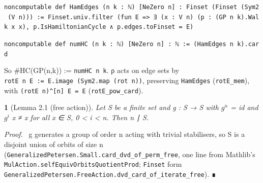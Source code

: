 \documentclass[11pt,a4paper]{article}
\theoremstyle{named}
\newtheorem*{namedthm}{}
\newenvironment{mdproof}[1][Proof]{\par\medskip\noindent\textit{#1.}\ }{\par\medskip}
\begin{document}
\begin{leancode}
\item \texttt{noncomputable\ \allowbreak{}def\ \allowbreak{}HamEdges\ \allowbreak{}(n\ \allowbreak{}k\ \allowbreak{}:\ \allowbreak{}ℕ)\ \allowbreak{}[NeZero\ \allowbreak{}n]\ \allowbreak{}:\ \allowbreak{}Finset\ \allowbreak{}(Finset\ \allowbreak{}(Sym2\ \allowbreak{}(V\ \allowbreak{}n)))\ \allowbreak{}:=\ \allowbreak{}Finset.\allowbreak{}univ.\allowbreak{}filter\ \allowbreak{}(fun\ \allowbreak{}E\ \allowbreak{}=\textgreater{}\ \allowbreak{}∃\ \allowbreak{}(x\ \allowbreak{}:\ \allowbreak{}V\ \allowbreak{}n)\ \allowbreak{}(p\ \allowbreak{}:\ \allowbreak{}(GP\ \allowbreak{}n\ \allowbreak{}k).\allowbreak{}Walk\ \allowbreak{}x\ \allowbreak{}x),\ \allowbreak{}p.\allowbreak{}IsHamiltonianCycle\ \allowbreak{}∧\ \allowbreak{}p.\allowbreak{}edges.\allowbreak{}toFinset\ \allowbreak{}=\ \allowbreak{}E)}
\item \texttt{noncomputable\ \allowbreak{}def\ \allowbreak{}numHC\ \allowbreak{}(n\ \allowbreak{}k\ \allowbreak{}:\ \allowbreak{}ℕ)\ \allowbreak{}[NeZero\ \allowbreak{}n]\ \allowbreak{}:\ \allowbreak{}ℕ\ \allowbreak{}:=\ \allowbreak{}(HamEdges\ \allowbreak{}n\ \allowbreak{}k).\allowbreak{}card}
\end{leancode}
So \#HC(GP(n,k)) := \texttt{numHC\ \allowbreak{}n\ \allowbreak{}k}. ρ acts on edge sets by \texttt{rotE\ \allowbreak{}n\ \allowbreak{}E\ \allowbreak{}:=\ \allowbreak{}E.\allowbreak{}image\ \allowbreak{}(Sym2.\allowbreak{}map\ \allowbreak{}(rot\ \allowbreak{}n))}, preserving \texttt{HamEdges} (\texttt{rotE\_\allowbreak{}mem}), with \texttt{(rotE\ \allowbreak{}n)\textasciicircum{}[n]\ \allowbreak{}E\ \allowbreak{}=\ \allowbreak{}E} (\texttt{rotE\_\allowbreak{}pow\_\allowbreak{}card}).

\begin{namedthm}[Lemma 2.1 (free action)]
Let S be a finite set and g : S → S with $g^n$ = id and $g^i$ x ≠ x for all x ∈ S, 0 \textless{} i \textless{} n. Then n ∣ \textbar{}S\textbar{}.
\end{namedthm}
\begin{mdproof}[Proof]
g generates a group of order n acting with trivial stabilisers, so S is a disjoint union of orbits of size n (\texttt{GeneralizedPetersen.\allowbreak{}Small.\allowbreak{}card\_\allowbreak{}dvd\_\allowbreak{}of\_\allowbreak{}perm\_\allowbreak{}free}, one line from Mathlib's \texttt{MulAction.\allowbreak{}selfEquivOrbitsQuotientProd}; \texttt{Finset} form \texttt{GeneralizedPetersen.\allowbreak{}FreeAction.\allowbreak{}dvd\_\allowbreak{}card\_\allowbreak{}of\_\allowbreak{}iterate\_\allowbreak{}free}). ∎
\end{mdproof}
\end{document}
